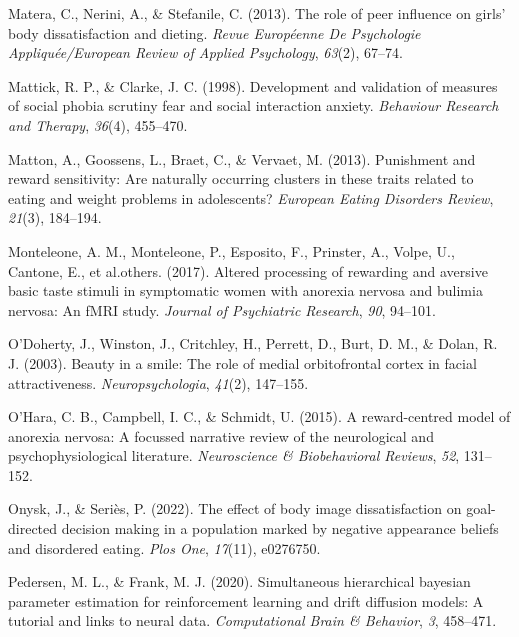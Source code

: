 \documentclass[
  man,floatsintext]{apa6}
\newlength{\cslhangindent}
\newlength{\cslentryspacingunit} %
\newenvironment{CSLReferences}[2] %
 {%
  \setlength{\parindent}{0pt}
  \ifodd #1
  \let\oldpar\par
  \def\par{\hangindent=\cslhangindent\oldpar}
  \fi
  \setlength{\parskip}{#2\cslentryspacingunit}
 }%
 {}
\begin{document}
\begin{CSLReferences}{1}{0}
\leavevmode{}%
Matera, C., Nerini, A., \& Stefanile, C. (2013). The role of peer influence on girls' body dissatisfaction and dieting. \emph{Revue Europ{é}enne De Psychologie Appliqu{é}e/European Review of Applied Psychology}, \emph{63}(2), 67--74.

\leavevmode{}%
Mattick, R. P., \& Clarke, J. C. (1998). Development and validation of measures of social phobia scrutiny fear and social interaction anxiety. \emph{Behaviour Research and Therapy}, \emph{36}(4), 455--470.

\leavevmode{}%
Matton, A., Goossens, L., Braet, C., \& Vervaet, M. (2013). Punishment and reward sensitivity: Are naturally occurring clusters in these traits related to eating and weight problems in adolescents? \emph{European Eating Disorders Review}, \emph{21}(3), 184--194.

\leavevmode{}%
Monteleone, A. M., Monteleone, P., Esposito, F., Prinster, A., Volpe, U., Cantone, E., et al.others. (2017). Altered processing of rewarding and aversive basic taste stimuli in symptomatic women with anorexia nervosa and bulimia nervosa: An fMRI study. \emph{Journal of Psychiatric Research}, \emph{90}, 94--101.

\leavevmode{}%
O'Doherty, J., Winston, J., Critchley, H., Perrett, D., Burt, D. M., \& Dolan, R. J. (2003). Beauty in a smile: The role of medial orbitofrontal cortex in facial attractiveness. \emph{Neuropsychologia}, \emph{41}(2), 147--155.

\leavevmode{}%
O'Hara, C. B., Campbell, I. C., \& Schmidt, U. (2015). A reward-centred model of anorexia nervosa: A focussed narrative review of the neurological and psychophysiological literature. \emph{Neuroscience \& Biobehavioral Reviews}, \emph{52}, 131--152.

\leavevmode{}%
Onysk, J., \& Seriès, P. (2022). The effect of body image dissatisfaction on goal-directed decision making in a population marked by negative appearance beliefs and disordered eating. \emph{Plos One}, \emph{17}(11), e0276750.

\leavevmode{}%
Pedersen, M. L., \& Frank, M. J. (2020). Simultaneous hierarchical bayesian parameter estimation for reinforcement learning and drift diffusion models: A tutorial and links to neural data. \emph{Computational Brain \& Behavior}, \emph{3}, 458--471.


\end{CSLReferences}
\end{document}

